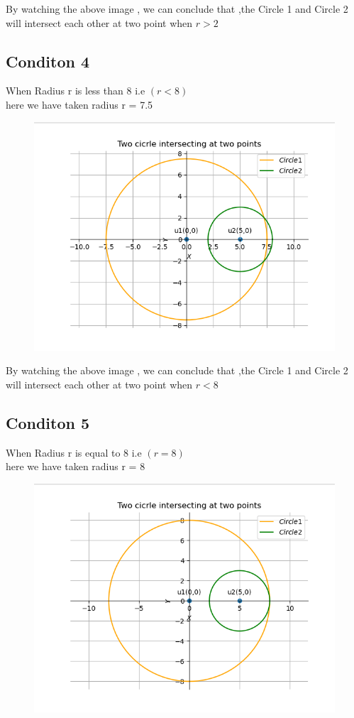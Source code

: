 \documentclass[journal,12pt,twocolumn]{IEEEtran}
\begin{document}
By watching the above image , we can conclude that ,the  Circle 1 and Circle 2 will intersect each other at two point when $r>2$
\subsection{Conditon 4} When Radius r is less than 8 i.e $(r<8)$\\
here we have taken radius r = 7.5
\begin{figure}[h]
    \centering
\includegraphics[width=\columnwidth]{circle4.png}
    \label{fig:my_label}
\end{figure}

By watching the above image , we can conclude that ,the  Circle 1 and Circle 2 will intersect each other at two point when $r<8$
\subsection{Conditon 5} When Radius r is equal to 8 i.e $(r=8)$\\
here we have taken radius r = 8
\begin{figure}[h]
    \centering
\includegraphics[width=\columnwidth]{circle5.png}
    \label{fig:my_label}
\end{figure}
\end{document}
